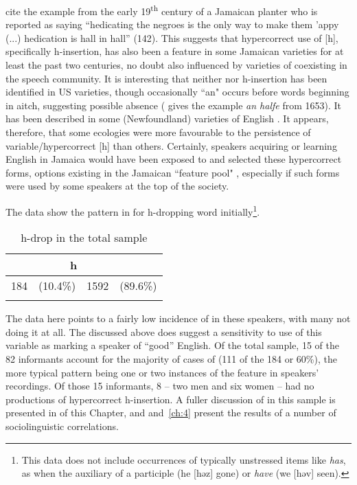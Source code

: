 \citet{LallaDCosta1990} cite the example from the early 19\textsuperscript{th} century of a Jamaican planter who is reported as saying “hedicating the negroes is the only way to make them 'appy (...) hedication is hall in hall” (142).  This suggests that hypercorrect use of [h], specifically h-insertion, has also been a feature in some Jamaican varieties for at least the past two centuries, no doubt also influenced by varieties of  coexisting in the speech community.  It is interesting that neither  nor h-insertion has been identified in US varieties, though occasionally ``an" occurs before words beginning in aitch, suggesting possible absence (\citealt[206]{Krapp1925} gives the example \textit{an halfe} from 1653).   It has been described in some  (Newfoundland) varieties of English \citep[447]{Kirwin2001}.  It appears, therefore, that some ecologies were more favourable to the persistence of variable\slash hypercorrect [h] than others.  Certainly, speakers acquiring or learning English in Jamaica would have been exposed to and selected these hypercorrect forms, options existing in the Jamaican ``feature pool" \citep[4]{Mufwene2001}, especially if such forms were used by some speakers at the top of the society.

The  data show the pattern in  for h-dropping word initially\footnote{This data does not include occurrences of typically unstressed items like \textit{has}, as when the auxiliary of a participle (he [hǝz] gone) or \textit{have} (we [hǝv] seen).}.

\begin{table}
\begin{tabular}{r@{ }rr@{ }r}
\lsptoprule
       \multicolumn{2}{c}{h-drop} & \multicolumn{2}{c}{h}\\
\midrule
184 & (10.4\%) & 1592  & (89.6\%)\\
\lspbottomrule
\end{tabular}
\caption{h-drop in the total sample}
\label{tab:2.1}
\end{table}

The data here points to a fairly low incidence of  in these speakers, with many not doing it at all.  The  discussed above does suggest a sensitivity to use of this variable as marking a speaker of “good” English.  Of the total sample, 15 of the 82 informants account for the majority of cases of  (111 of the 184 or 60\%), the more typical pattern being one or two instances of the feature in speakers’ recordings.  Of those 15 informants, 8 – two men and six women – had no productions of hypercorrect h-insertion.  A fuller discussion of  in this sample is presented in  of this Chapter, and  and~\ref{ch:4} present the results of a number of sociolinguistic correlations.   

